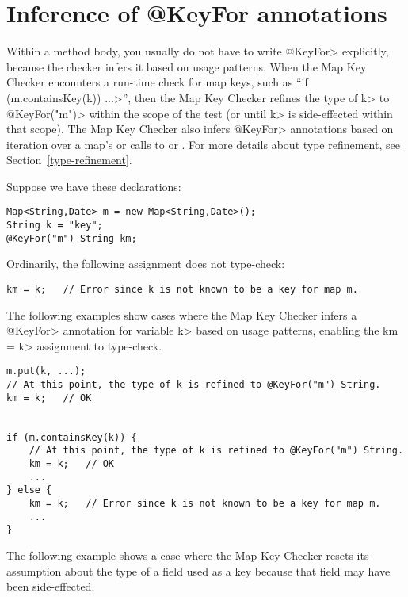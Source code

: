 \section{Inference of @KeyFor annotations\label{map-key-annotations-inference}}

Within a method body, you usually do not have to write \<@KeyFor> explicitly,
because the checker infers it based on usage patterns.  When the Map Key
Checker encounters a run-time check for map keys, such as
``\<if (m.containsKey(k)) ...>'', then the Map Key Checker refines the type of
\<k> to \<@KeyFor("m")> within the scope of the test (or until \<k> is
side-effected within that scope).  The Map Key Checker also infers \<@KeyFor>
annotations based on iteration over a map's
 or calls to
or
.
For more details about type refinement, see Section~\ref{type-refinement}.

Suppose we have these declarations:

\begin{verbatim}
Map<String,Date> m = new Map<String,Date>();
String k = "key";
@KeyFor("m") String km;
\end{verbatim}

Ordinarily, the following assignment does not type-check:

\begin{verbatim}
km = k;   // Error since k is not known to be a key for map m.
\end{verbatim}

The following examples show cases where the Map Key Checker
infers a \<@KeyFor> annotation for variable \<k> based on usage patterns,
enabling the \<km = k> assignment to type-check.


\begin{verbatim}
m.put(k, ...);
// At this point, the type of k is refined to @KeyFor("m") String.
km = k;   // OK


if (m.containsKey(k)) {
    // At this point, the type of k is refined to @KeyFor("m") String.
    km = k;   // OK
    ...
} else {
    km = k;   // Error since k is not known to be a key for map m.
    ...
}
\end{verbatim}


The following example shows a case where the Map Key Checker resets its
assumption about the type of a field used as a key because that field may have
been side-effected.


